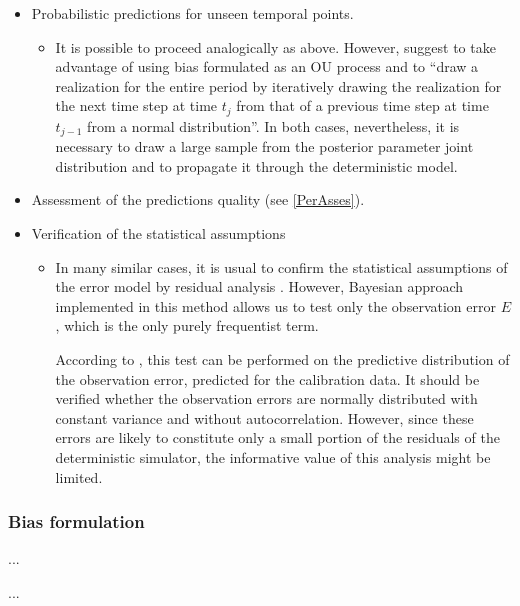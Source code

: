 \documentclass{ctuthesis}\usepackage[]{graphicx}\usepackage[]{color}
\begin{document}
\begin{itemize}
	\item  Probabilistic predictions for unseen temporal points.
	\begin{itemize}
                \item 	It is possible to proceed analogically as above. However, \cite{giudice2013improving} suggest to take advantage of using bias formulated as an  OU process and to \enquote{draw a realization for the entire period by iteratively drawing the realization for the next time step at time   $t_ j$ from that of a previous time step at time $t_ {j-1}$ from a normal distribution}. In both cases, nevertheless, it is necessary to draw a large sample from the  posterior parameter joint distribution and to propagate it through the deterministic model.
        \end{itemize}

	\item Assessment of the predictions quality (see \ref{PerAsses}).
	
	\item Verification of the statistical assumptions
	\begin{itemize}
                \item 	In many similar cases, it is usual to confirm the statistical assumptions of the error model by residual analysis \citep{reichert2012linking}. However, Bayesian approach implemented in this method allows us to test only the observation error $E$, which is the only purely frequentist term. 

According to \cite{giudice2013improving}, this test can be performed on the predictive distribution of the observation error, predicted for the calibration data. It should be verified whether the observation errors are normally distributed with constant variance and without autocorrelation. However, since these errors are likely to constitute only a small portion of the residuals of the deterministic simulator, the informative value of this analysis might be limited.
        \end{itemize}

	
\end{itemize}


\subsubsection{Bias formulation} \label{biasTheor}

...

...
\end{document}
